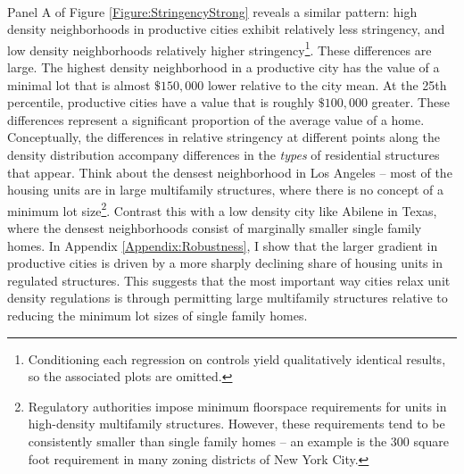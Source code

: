 \documentclass[12pt]{article}
\begin{document}
	\paragraph*{}
	Panel A of Figure \ref{Figure:StringencyStrong} reveals a similar pattern: high density neighborhoods in productive cities exhibit relatively less stringency, and low density neighborhoods relatively higher stringency\footnote{Conditioning each regression on controls yield qualitatively identical results, so the associated plots are omitted.}. These differences are large. The highest density neighborhood in a productive city has the value of a minimal lot that is almost $\$ 150,000$ lower relative to the city mean. At the 25th percentile, productive cities have a value that is roughly $\$ 100,000$ greater. These differences represent a significant proportion of the average value of a home. Conceptually, the differences in relative stringency at different points along the density distribution accompany differences in the \textit{types} of residential structures that appear. Think about the densest neighborhood in Los Angeles -- most of the housing units are in large multifamily structures, where there is no concept of a minimum lot size\footnote{Regulatory authorities impose minimum floorspace requirements for units in high-density multifamily structures. However, these requirements tend to be consistently smaller than single family homes -- an example is the 300 square foot requirement in many zoning districts of New York City.}. Contrast this with a low density city like Abilene in Texas, where the densest neighborhoods consist of marginally smaller single family homes. In Appendix \ref{Appendix:Robustness}, I show that the larger gradient in productive cities is driven by a more sharply declining share of housing units in regulated structures. This suggests that the most important way cities relax unit density regulations is through permitting large multifamily structures relative to reducing the minimum lot sizes of single family homes.
	
	
\end{document}
